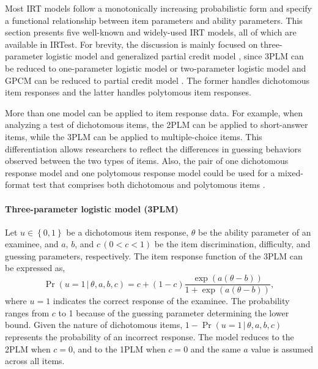 Most IRT models follow a monotonically increasing probabilistic form and
specify a functional relationship between item parameters and ability
parameters. This section presents five well-known and widely-used IRT
models, all of which are available in IRTest. For brevity, the
discussion is mainly focused on three-parameter logistic model \citep[3PLM:][]{Birnbaum:1968} and generalized partial credit model \citep[GPCM:][]{Muraki:1992}, since 3PLM can be reduced to one-parameter logistic model
\citep[1PLM:][]{Rasch:1960} or two-parameter logistic model \citep[2PLM:][]{Birnbaum:1968} and GPCM can be reduced to partial credit model \citep[PCM:][]{Masters:1982}. The former handles dichotomous item responses and the
latter handles polytomous item responses.

More than one model can be applied to item response data. For example,
when analyzing a test of dichotomous items, the 2PLM can be applied to
short-answer items, while the 3PLM can be applied to multiple-choice
items. This differentiation allows researchers to reflect the
differences in guessing behaviors observed between the two types of
items. Also, the pair of one dichotomous response model and one
polytomous response model could be used for a mixed-format test that
comprises both dichotomous and polytomous items \citep{Baker+Kim:2004}.

\hypertarget{three-parameter-logistic-model-3plm}{%
\paragraph{Three-parameter logistic model (3PLM)}\label{three-parameter-logistic-model-3plm}}

Let \(u \in \left\{ 0, 1 \right\}\) be a dichotomous item response,
\(\theta\) be the ability parameter of an examinee, and \(a\), \(b\), and
\(c \, (0<c<1)\) be the item discrimination, difficulty, and guessing
parameters, respectively. The item response function of the 3PLM can be
expressed as, \[\Pr( u = 1 \, | \, \theta, a, b, c) = c + (1 - c)
\frac{\exp{\left(a (\theta - b) \right)}}{1 + \exp{\left(a (\theta - b) \right)}},
\label{eq:3PLM}\] where \(u=1\) indicates the correct response of the
examinee. The probability ranges from \(c\) to 1 because of the guessing
parameter determining the lower bound. Given the nature of dichotomous
items, \(1-\Pr( u = 1 \, | \, \theta, a, b, c)\) represents the
probability of an incorrect response. The model reduces to the 2PLM when
\(c=0\), and to the 1PLM when \(c=0\) and the same \(a\) value is assumed
across all items.

